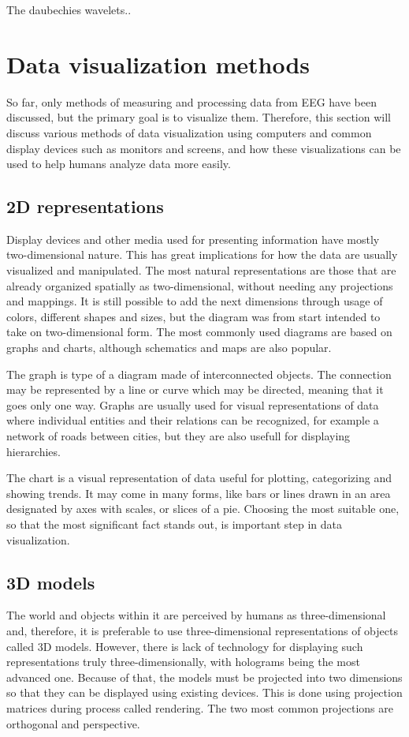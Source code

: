 The daubechies wavelets..


\section{Data visualization methods}
So far, only methods of measuring and processing data from EEG have been
discussed, but the primary goal is to visualize them. Therefore, this section
will discuss various methods of data visualization using computers and common
display devices such as monitors and screens, and how these visualizations can
be used to help humans analyze data more easily.

\subsection{2D representations}
Display devices and other media used for presenting information have mostly
two-dimensional nature. This has great implications for how the data are usually
visualized and manipulated. The most natural representations are those that are
already organized spatially as two-dimensional, without needing any projections
and mappings. It is still possible to add the next dimensions through usage of
colors, different shapes and sizes, but the diagram was from start intended to
take on two-dimensional form. The most commonly used diagrams are based on
graphs and charts, although schematics and maps are also popular.

The graph is type of a diagram made of interconnected objects. The connection
may be represented by a line or curve which may be directed, meaning that it
goes only one way. Graphs are usually used for visual representations of data
where individual entities and their relations can be recognized, for example a
network of roads between cities, but they are also usefull for displaying
hierarchies.

The chart is a visual representation of data useful for plotting, categorizing
and showing trends. It may come in many forms, like bars or lines drawn in an
area designated by axes with scales, or slices of a pie. Choosing the most
suitable one, so that the most significant fact stands out, is important step in
data visualization.

\subsection{3D models}
The world and objects within it are perceived by humans as three-dimensional
and, therefore, it is preferable to use three-dimensional representations of
objects called 3D models. However, there is lack of technology for displaying
such representations truly three-dimensionally, with holograms being the most
advanced one. Because of that, the models must be projected into two dimensions
so that they can be displayed using existing devices. This is done using
projection matrices during process called rendering. The two most common
projections are orthogonal and perspective.

